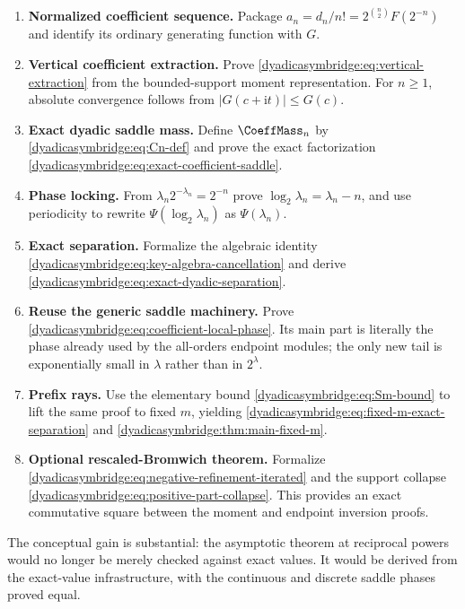 \documentclass[11pt,oneside]{article}
\theoremstyle{definition}
\theoremstyle{remark}
\newcommand{\ii}{\mathrm i}
\begin{document}
\begin{enumerate}
\item \textbf{Normalized coefficient sequence.}  Package
$a_n=d_n/n!=2^{\binom n2}F(2^{-n})$ and identify its ordinary generating function with $G$.

\item \textbf{Vertical coefficient extraction.}  Prove
\eqref{dyadicasymbridge:eq:vertical-extraction} from the bounded-support moment representation.  For $n\ge1$, absolute convergence follows from
$|G(c+\ii t)|\le G(c)$.

\item \textbf{Exact dyadic saddle mass.}  Define $\CoeffMass_n$ by
\eqref{dyadicasymbridge:eq:Cn-def} and prove the exact factorization
\eqref{dyadicasymbridge:eq:exact-coefficient-saddle}.

\item \textbf{Phase locking.}  From
$\lambda_n2^{-\lambda_n}=2^{-n}$ prove
$\log_2\lambda_n=\lambda_n-n$, and use periodicity to rewrite
$\Psi(\log_2\lambda_n)$ as $\Psi(\lambda_n)$.

\item \textbf{Exact separation.}  Formalize the algebraic identity
\eqref{dyadicasymbridge:eq:key-algebra-cancellation} and derive
\eqref{dyadicasymbridge:eq:exact-dyadic-separation}.

\item \textbf{Reuse the generic saddle machinery.}  Prove
\eqref{dyadicasymbridge:eq:coefficient-local-phase}.  Its main part is literally the phase already used by the all-orders endpoint modules; the only new tail is exponentially small in $\lambda$ rather than in $2^\lambda$.

\item \textbf{Prefix rays.}  Use the elementary bound
\eqref{dyadicasymbridge:eq:Sm-bound} to lift the same proof to fixed $m$, yielding
\eqref{dyadicasymbridge:eq:fixed-m-exact-separation} and \cref{dyadicasymbridge:thm:main-fixed-m}.

\item \textbf{Optional rescaled-Bromwich theorem.}  Formalize
\eqref{dyadicasymbridge:eq:negative-refinement-iterated} and the support collapse
\eqref{dyadicasymbridge:eq:positive-part-collapse}.  This provides an exact commutative square between the moment and endpoint inversion proofs.
\end{enumerate}

The conceptual gain is substantial: the asymptotic theorem at reciprocal powers would no longer be merely checked against exact values.  It would be derived from the exact-value infrastructure, with the continuous and discrete saddle phases proved equal.
\end{document}
